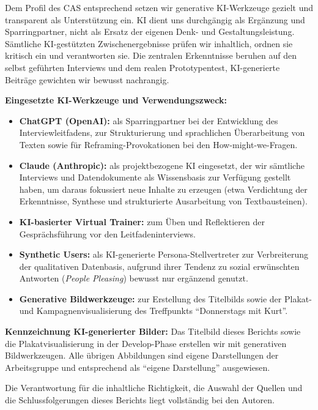 Dem Profil des CAS entsprechend setzen wir generative KI-Werkzeuge gezielt und transparent als Unterstützung ein. KI dient uns durchgängig als Ergänzung und Sparringpartner, nicht als Ersatz der eigenen Denk- und Gestaltungsleistung. Sämtliche KI-gestützten Zwischenergebnisse prüfen wir inhaltlich, ordnen sie kritisch ein und verantworten sie. Die zentralen Erkenntnisse beruhen auf den selbst geführten Interviews und dem realen Prototypentest, KI-generierte Beiträge gewichten wir bewusst nachrangig.

\textbf{Eingesetzte KI-Werkzeuge und Verwendungszweck:}
\begin{itemize}
  \item \textbf{ChatGPT (OpenAI):} als Sparringpartner bei der Entwicklung des Interviewleitfadens, zur Strukturierung und sprachlichen Überarbeitung von Texten sowie für Reframing-Provokationen bei den How-might-we-Fragen.
  \item \textbf{Claude (Anthropic):} als projektbezogene KI eingesetzt, der wir sämtliche Interviews und Datendokumente als Wissensbasis zur Verfügung gestellt haben, um daraus fokussiert neue Inhalte zu erzeugen (etwa Verdichtung der Erkenntnisse, Synthese und strukturierte Ausarbeitung von Textbausteinen).
  \item \textbf{KI-basierter Virtual Trainer:} zum Üben und Reflektieren der Gesprächsführung vor den Leitfadeninterviews.
  \item \textbf{Synthetic Users:} als KI-generierte Persona-Stellvertreter zur Verbreiterung der qualitativen Datenbasis, aufgrund ihrer Tendenz zu sozial erwünschten Antworten (\emph{People Pleasing}) bewusst nur ergänzend genutzt.
  \item \textbf{Generative Bildwerkzeuge:} zur Erstellung des Titelbilds sowie der Plakat- und Kampagnenvisualisierung des Treffpunkts ``Donnerstags mit Kurt''.
\end{itemize}

\textbf{Kennzeichnung KI-generierter Bilder:} Das Titelbild dieses Berichts sowie die Plakatvisualisierung in der Develop-Phase erstellen wir mit generativen Bildwerkzeugen. Alle übrigen Abbildungen sind eigene Darstellungen der Arbeitsgruppe und entsprechend als ``eigene Darstellung'' ausgewiesen.

Die Verantwortung für die inhaltliche Richtigkeit, die Auswahl der Quellen und die Schlussfolgerungen dieses Berichts liegt vollständig bei den Autoren.
